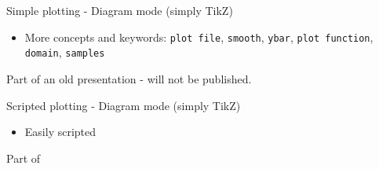 \documentclass[aspectratio=169]{beamer}
\begin{document}
\begin{frame}{Simple plotting - Diagram mode (simply TikZ)}
\begin{center}
\begin{tikzpicture}[xscale=1,yscale=15]
      \end{tikzpicture}
      \end{center}
      
      \vspace{-20pt}
      
      \begin{itemize}
          \item More concepts and keywords: \texttt{plot file}, \texttt{smooth}, \texttt{ybar}, \texttt{plot function}, \texttt{domain}, \texttt{samples}
      \end{itemize}
      
      \small Part of an old presentation - will not be published.
      
\end{frame}

\begin{frame}{Scripted plotting - Diagram mode (simply TikZ)}
    
    \vspace{-15pt}
    
    \begin{center}
        
    \end{center}
    
    \vspace{-15pt}
    
    \begin{itemize}
        \item Easily scripted
    \end{itemize}
    {\footnotesize 
    Part of 
    }
            
\end{frame}
\end{document}
